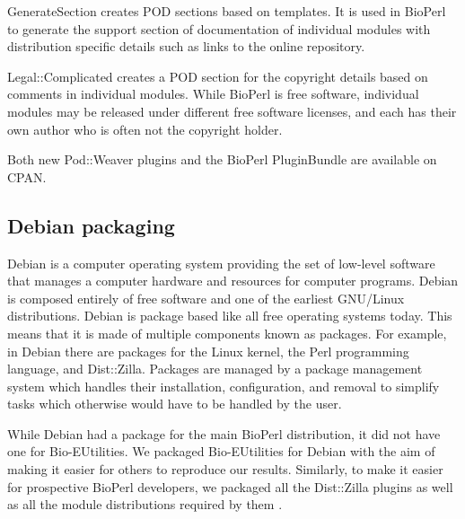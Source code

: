 GenerateSection creates POD sections based on templates.  It is
used in BioPerl to generate the support section of documentation
of individual modules
with distribution specific details such as links to the online
repository.

Legal::Complicated creates a POD section for the copyright details
based on comments in individual modules.  While BioPerl is free
software, individual modules may be released under different free
software licenses, and each has their own author who is often not
the copyright holder.

Both new Pod::Weaver plugins and the BioPerl PluginBundle are available
on CPAN.

\subsection{Debian packaging}

Debian is a computer operating system providing the set of low-level software
that manages a computer hardware and resources for computer programs.
Debian is
composed entirely of free software and one of the earliest GNU/Linux
distributions.
Debian is package based like all free operating systems today.
This means that it is made of multiple components known as
packages.  For example, in Debian there are packages for the Linux
kernel, the Perl programming language, and Dist::Zilla.  Packages are
managed by a package management system which handles their
installation, configuration, and removal to simplify tasks which otherwise would
have to be handled by the user.

While Debian had a package for the main BioPerl distribution, it did
not have one for Bio-EUtilities.  We packaged Bio-EUtilities for
Debian with the aim of making it easier for
others to reproduce our results.
Similarly, to make it easier for prospective BioPerl
developers, we packaged all the Dist::Zilla plugins as well
as all the module distributions required by them
.

